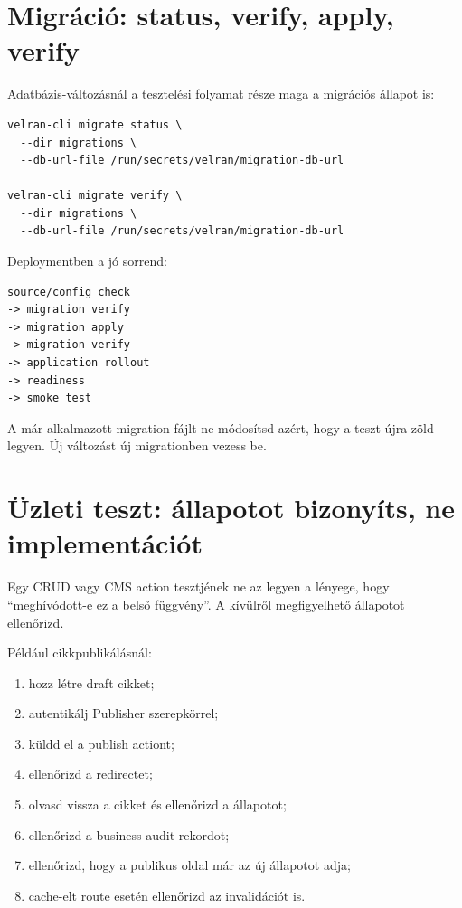 \section{Migráció: status, verify, apply, verify}

Adatbázis-változásnál a tesztelési folyamat része maga a migrációs állapot is:

\begin{lstlisting}
velran-cli migrate status \
  --dir migrations \
  --db-url-file /run/secrets/velran/migration-db-url

velran-cli migrate verify \
  --dir migrations \
  --db-url-file /run/secrets/velran/migration-db-url
\end{lstlisting}

Deploymentben a jó sorrend:

\begin{lstlisting}
source/config check
-> migration verify
-> migration apply
-> migration verify
-> application rollout
-> readiness
-> smoke test
\end{lstlisting}

A már alkalmazott migration fájlt ne módosítsd azért, hogy a teszt újra zöld legyen. Új változást új migrationben vezess be.

\section{Üzleti teszt: állapotot bizonyíts, ne implementációt}

Egy CRUD vagy CMS action tesztjének ne az legyen a lényege, hogy ``meghívódott-e ez a belső függvény''. A kívülről megfigyelhető állapotot ellenőrizd.

Például cikkpublikálásnál:

\begin{enumerate}
  \item hozz létre draft cikket;
  \item autentikálj Publisher szerepkörrel;
  \item küldd el a publish actiont;
  \item ellenőrizd a redirectet;
  \item olvasd vissza a cikket és ellenőrizd a  állapotot;
  \item ellenőrizd a business audit rekordot;
  \item ellenőrizd, hogy a publikus oldal már az új állapotot adja;
  \item cache-elt route esetén ellenőrizd az invalidációt is.
\end{enumerate}

